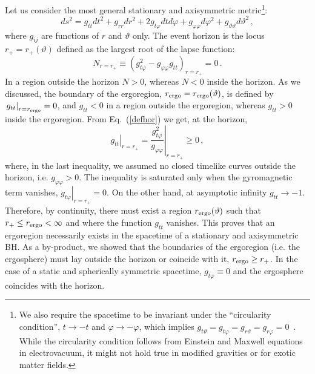\documentclass[11pt]{article}
\numberwithin{equation}{section} %
\begin{document}
Let us consider the most general stationary and axisymmetric metric\footnote{We also require the spacetime to be invariant under the ``circularity condition'', $t\to-t$ and $\varphi\to-\varphi$, which implies $g_{t\vartheta}=g_{t\varphi}=g_{r\vartheta}=g_{r\varphi}=0$~\cite{Chandra}. While the circularity condition follows from Einstein and Maxwell equations in electrovacuum, it might not hold true in modified gravities or for exotic matter fields.}:
\begin{equation}
ds^2=g_{tt} dt^2+g_{rr}dr^2+2g_{t\varphi}dtd\varphi+g_{\varphi\varphi} d\varphi^2+g_{\vartheta\vartheta}d\vartheta^2\,, 
\end{equation}
where $g_{ij}$ are functions of $r$ and $\vartheta$ only. The event horizon is the locus $r_+=r_+(\vartheta)$ defined as the largest root of the lapse function:
%
\begin{equation}
N_{r=r_+}\equiv\left( g_{t\varphi}^2-g_{\varphi\varphi}g _{tt}\right)_{r=r_+}=0\,. \label{defhor}
\end{equation}
In a region outside the horizon $N>0$, whereas $N<0$ inside the horizon. As we discussed, the boundary of the ergoregion, $r_{\rm ergo}=r_{\rm ergo}(\vartheta)$, is defined by $\left. g _{tt}\right|_{r=r_{\rm ergo}}=0$, and $g_{tt}<0$ in a region outside the ergoregion, whereas $g_{tt}>0$ inside the ergoregion.
%
%
From Eq.~(\ref{defhor}) we get, at the horizon, 
\begin{equation}
 \left.g_{tt}\right|_{r=r_+}= \left.\frac{g_{t\varphi}^2}{g_{\varphi\varphi}}\right|_{r=r_+}\geq0\,,
\end{equation}
where, in the last inequality, we assumed no closed timelike curves outside the horizon, i.e. $g_{\varphi\varphi}>0$. The inequality is saturated only when the gyromagnetic term vanishes, $\left.g_{t\varphi}\right|_{r=r_+}=0$.
%
On the other hand, at asymptotic infinity $g_{tt}\to-1$. Therefore, by continuity, there must exist a region $r_{\rm ergo}(\vartheta)$ such that $r_+\leq r_{\rm ergo}<\infty$ and where the function $g_{tt}$ vanishes.
This proves that an ergoregion necessarily exists in the spacetime of a stationary and axisymmetric BH. As a by-product, we showed that the boundaries of the ergoregion (i.e. the ergosphere) must lay outside the horizon or coincide with it, $r_{\rm ergo}\geq r_+$. In the case of a static and spherically symmetric spacetime, $g_{t\varphi}\equiv0$ and the ergosphere coincides with the horizon.


\end{document}
